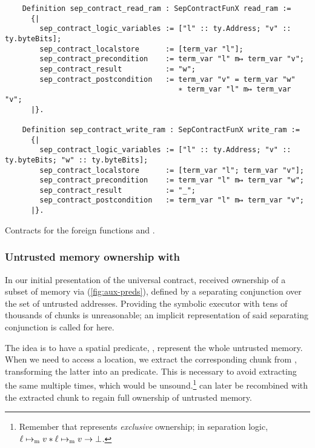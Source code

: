 \begin{listing}
  \begin{verbatim}
    Definition sep_contract_read_ram : SepContractFunX read_ram :=
      {|
        sep_contract_logic_variables := ["l" :: ty.Address; "v" :: ty.byteBits];
        sep_contract_localstore      := [term_var "l"];
        sep_contract_precondition    := term_var "l" m↦ term_var "v";
        sep_contract_result          := "w";
        sep_contract_postcondition   := term_var "v" = term_var "w"
                                        ∗ term_var "l" m↦ term_var "v";
      |}.

    Definition sep_contract_write_ram : SepContractFunX write_ram :=
      {|
        sep_contract_logic_variables := ["l" :: ty.Address; "v" :: ty.byteBits; "w" :: ty.byteBits];
        sep_contract_localstore      := [term_var "l"; term_var "v"];
        sep_contract_precondition    := term_var "l" m↦ term_var "w";
        sep_contract_result          := "_";
        sep_contract_postcondition   := term_var "l" m↦ term_var "v";
      |}.
  \end{verbatim}
  \caption{Contracts for the foreign functions  and .}
  \label{lst:read-write-foreign-contracts}
\end{listing}

\subsubsection{Untrusted memory ownership with }

In our initial presentation of the universal contract,  received ownership of a subset of memory via  (\cref{fig:aux-preds}), defined by a separating conjunction over the set of untrusted addresses. Providing the symbolic executor with tens of thousands of  chunks is unreasonable; an implicit representation of said separating conjunction is called for here.

The idea is to have a spatial predicate, , represent the whole untrusted memory. When we need to access a location, we extract the corresponding  chunk from , transforming the latter into an  predicate. This is necessary to avoid extracting the same  multiple times, which would be unsound.\footnote{Remember that  represents \emph{exclusive} ownership; in separation logic, \(\ell \mapsto_{\mathrm{m}} v \ast \ell \mapsto_{\mathrm{m}} v \to \bot\).}  can later be recombined with the extracted chunk to regain full ownership of untrusted memory.

